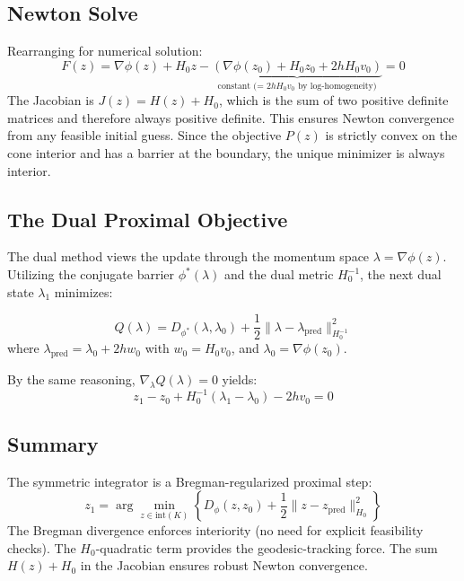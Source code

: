 \subsection{Newton Solve}
Rearranging for numerical solution:
\begin{equation}
F(z) = \nabla \phi(z) + H_0 z - \underbrace{(\nabla \phi(z_0) + H_0 z_0 + 2h H_0 v_0)}_{\text{constant (= $2h H_0 v_0$ by log-homogeneity)}} = 0
\end{equation}
The Jacobian is $J(z) = H(z) + H_0$, which is the sum of two positive definite matrices and therefore always positive definite. This ensures Newton convergence from any feasible initial guess. Since the objective $P(z)$ is strictly convex on the cone interior and has a barrier at the boundary, the unique minimizer is always interior.

\subsection{The Dual Proximal Objective}
The dual method views the update through the momentum space $\lambda = \nabla \phi(z)$. Utilizing the conjugate barrier $\phi^*(\lambda)$ and the dual metric $H_0^{-1}$, the next dual state $\lambda_1$ minimizes:

\begin{equation}
Q(\lambda) = D_{\phi^*}(\lambda, \lambda_0) + \frac{1}{2}\|\lambda - \lambda_{\mathrm{pred}}\|_{H_0^{-1}}^2
\end{equation}
where $\lambda_{\mathrm{pred}} = \lambda_0 + 2h w_0$ with $w_0 = H_0 v_0$, and $\lambda_0 = \nabla \phi(z_0)$.

By the same reasoning, $\nabla_\lambda Q(\lambda) = 0$ yields:
\begin{equation}
\label{eq:dual_update}
z_1 - z_0 + H_0^{-1}(\lambda_1 - \lambda_0) - 2hv_0 = 0
\end{equation}

\subsection{Summary}
The symmetric integrator is a Bregman-regularized proximal step:
\begin{equation}
z_1 = \arg\min_{z \in \mathrm{int}(K)} \left\{ D_\phi(z, z_0) + \frac{1}{2}\|z - z_{\mathrm{pred}}\|_{H_0}^2 \right\}
\end{equation}
The Bregman divergence enforces interiority (no need for explicit feasibility checks). The $H_0$-quadratic term provides the geodesic-tracking force. The sum $H(z) + H_0$ in the Jacobian ensures robust Newton convergence.
